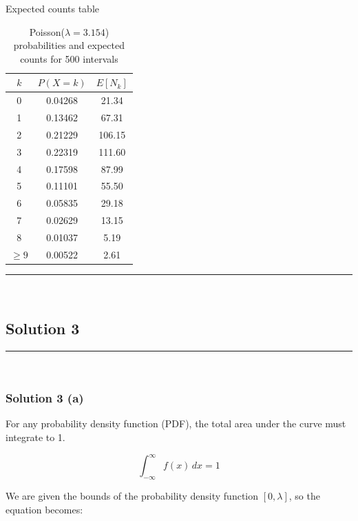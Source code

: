 \documentclass{article}
\begin{document}
\subsubsection*{\normalfont}{Expected counts table}

\begin{table}[h]
\centering
\caption{Poisson($\lambda{=}3.154$) probabilities and expected counts for 500 intervals}
\label{tab:poisson_distribution_fixed}
\begin{tabular}{c S[table-format=1.5] S[table-format=3.2]}
\toprule
{$k$} & {$P(X=k)$} & {$E[N_k]$} \\
 & 0.04268 & 21.34 \\
1 & 0.13462 & 67.31 \\
2 & 0.21229 & 106.15 \\
3 & 0.22319 & 111.60 \\
4 & 0.17598 & 87.99 \\
5 & 0.11101 & 55.50 \\
6 & 0.05835 & 29.18 \\
7 & 0.02629 & 13.15 \\
8 & 0.01037 & 5.19 \\
$\geq 9$ & 0.00522 & 2.61 \\
\bottomrule
\end{tabular}
\end{table}

\noindent\rule{\textwidth}{0.4pt}\\

\newpage


\subsection*{Solution 3}
\noindent\rule{\textwidth}{0.4pt}\\
\subsubsection*{Solution 3 (a)}
\begin{flushleft}
    For any probability density function (PDF), the total area under the curve must integrate to 1.
\end{flushleft}

$$\int_{-\infty}^{\infty} f(x) \,dx = 1$$

\begin{flushleft}
    We are given the bounds of the probability density function $[0, \lambda]$, so the equation becomes:
\end{flushleft}
\end{document}
